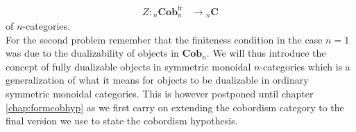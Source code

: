 \begin{align*}
  Z
  \colon
  {_{n}}\mathbf{Cob}_{n}^{\mathrm{fr}}
  &\to
  {_{n}}\mathbf{C}
\end{align*}
of $n$-categories.
\\
For the second problem remember that the finiteness condition in the case $n = 1$ was due to the dualizability of objects in $\mathbf{Cob}_{n}$. We will thus introduce the concept of fully dualizable objects in symmetric monoidal $n$-categories which is a generalization of what it means for objects to be dualizable in ordinary symmetric monoidal categories. This is however postponed until chapter \ref{chap:formcobhyp} as we first carry on extending the cobordism category to the final version we use to state the cobordism hypothesis.
